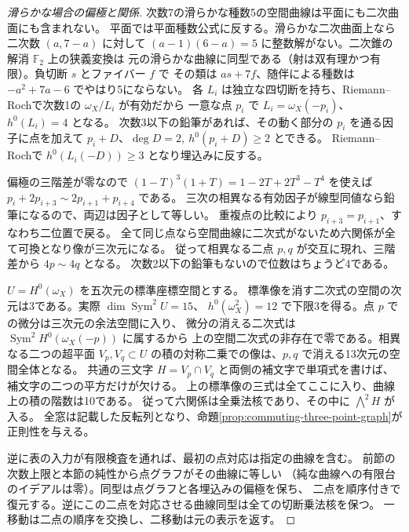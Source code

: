 \begin{proof}[滑らかな場合の偏極と関係]
次数7の滑らかな種数5の空間曲線は平面にも二次曲面にも含まれない。
平面では平面種数公式に反する。滑らかな二次曲面上なら二次数 $(a,7-a)$ に対して
$(a-1)(6-a)=5$ に整数解がない。二次錐の解消 $\mathbb F_2$ 上の狭義変換は
元の滑らかな曲線に同型である（射は双有理かつ有限）。負切断 $s$ とファイバー $f$ で
その類は $as+7f$、随伴による種数は $-a^2+7a-6$ でやはり5にならない。
各 $L_i$ は独立な四切断を持ち、Riemann--Rochで次数1の $\omega_X/L_i$ が有効だから
一意な点 $p_i$ で $L_i=\omega_X(-p_i)$、$h^0(L_i)=4$ となる。
次数3以下の鉛筆があれば、その動く部分の $p_i$ を通る因子に点を加えて
$p_i+D$、$\deg D=2,\ h^0(p_i+D)\ge2$ とできる。
Riemann--Rochで $h^0(L_i(-D))\ge3$ となり埋込みに反する。

偏極の三階差が零なので $(1-T)^3(1+T)=1-2T+2T^3-T^4$ を使えば
$p_i+2p_{i+3}\sim 2p_{i+1}+p_{i+4}$ である。
三次の相異なる有効因子が線型同値なら鉛筆になるので、両辺は因子として等しい。
重複点の比較により $p_{i+3}=p_{i+1}$、すなわち二位置で戻る。
全て同じ点なら空間曲線に二次式がないため六関係が全て可換となり像が三次元になる。
従って相異なる二点 $p,q$ が交互に現れ、三階差から $4p\sim4q$ となる。
次数2以下の鉛筆もないので位数はちょうど4である。

$U=H^0(\omega_X)$ を五次元の標準座標空間とする。
標準像を消す二次式の空間の次元は3である。実際 $\dim\operatorname{Sym}^2U=15$、
$h^0(\omega_X^2)=12$ で下限3を得る。点 $p$ での微分は三次元の余法空間に入り、
微分の消える二次式は $\operatorname{Sym}^2 H^0(\omega_X(-p))$ に属するから
上の空間二次式の非存在で零である。相異なる二つの超平面
$V_p,V_q\subset U$ の積の対称二乗での像は、$p,q$ で消える13次元の空間全体となる。
共通の三文字 $H=V_p\cap V_q$ と両側の補文字で単項式を書けば、補文字の二つの平方だけが欠ける。
上の標準像の三式は全てここに入り、曲線上の積の階数は10である。
従って六関係は全乗法核であり、その中に $\bigwedge^2H$ が入る。
全窓は記載した反転列となり、命題\ref{prop:commuting-three-point-graph}が正則性を与える。

逆に表の入力が有限検査を通れば、最初の点対応は指定の曲線を含む。
前節の次数上限と本節の純性から点グラフがその曲線に等しい
（純な曲線への有限台のイデアルは零）。同型は点グラフと各埋込みの偏極を保ち、
二点を順序付きで復元する。逆にこの二点を対応させる曲線同型は全ての切断乗法核を保つ。
一移動は二点の順序を交換し、二移動は元の表示を返す。
\end{proof}
